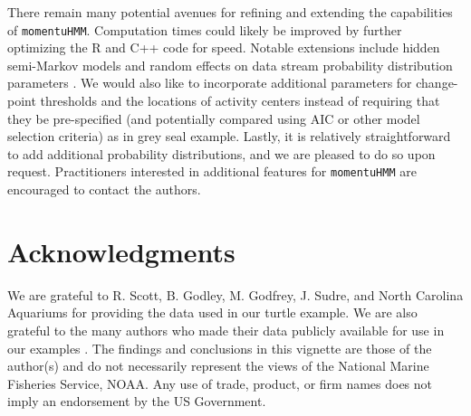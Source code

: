 \documentclass[12pt]{article}\usepackage[]{graphicx}\usepackage[]{xcolor}
\begin{document}
There remain many potential avenues for refining and extending the capabilities of \verb|momentuHMM|. Computation times could likely be improved by further optimizing the R and C++ code for speed. Notable extensions include hidden semi-Markov models and random effects on data stream probability distribution parameters \citep{ZucchiniEtAl2016}. We would also like to incorporate additional parameters for change-point thresholds and the locations of activity centers instead of requiring that they be pre-specified (and potentially compared using AIC or other model selection criteria) as in grey seal example. Lastly, it is relatively straightforward to add additional probability distributions, and we are pleased to do so upon request. Practitioners interested in additional features for \verb|momentuHMM| are encouraged to contact the authors.

\section*{Acknowledgments} 
We are grateful to R. Scott, B. Godley, M. Godfrey, J. Sudre, and North Carolina Aquariums for providing the data used in our turtle example. We are also grateful to the many authors who made their data publicly available for use in our examples \citep{WallEtAl2014,PirottaEtAl2018,IsojunnoEtAl2017,Leos-BarajasEtAl2017,AdamEtAl2019}. The findings and conclusions in this vignette are those of the author(s) and do not necessarily represent the views of the National Marine Fisheries Service, NOAA. Any use of trade, product, or firm names does not imply an endorsement by the US Government.




\clearpage
\end{document}
